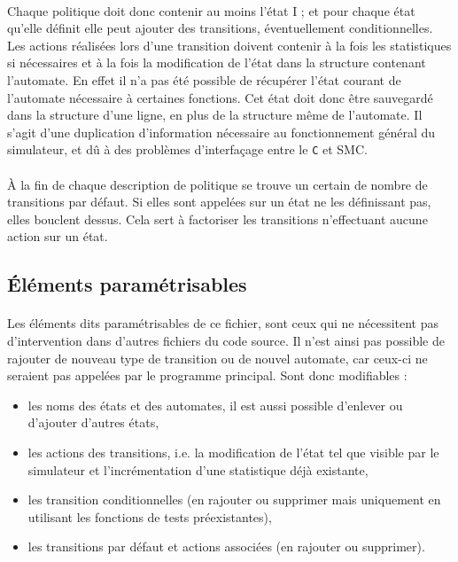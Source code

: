 \paragraph{}
Chaque politique doit donc contenir au moins l'état I ; et pour chaque état qu'elle définit elle peut ajouter des transitions, éventuellement conditionnelles. Les actions réalisées lors d'une transition doivent contenir à la fois les statistiques si nécessaires et à la fois la modification de l'état dans la structure contenant l'automate. En effet il n'a pas été possible de récupérer l'état courant de l'automate nécessaire à certaines fonctions. Cet état doit donc être sauvegardé dans la structure d'une ligne, en plus de la structure même de l'automate. Il s'agit d'une duplication d'information nécessaire au fonctionnement général du simulateur, et dû à des problèmes d'interfaçage entre le \texttt{C} et \textsf{SMC}.

\paragraph{}
\`A la fin de chaque description de politique se trouve un certain de nombre de transitions par défaut. Si elles sont appelées sur un état ne les définissant pas, elles bouclent dessus. Cela sert à factoriser les transitions n'effectuant aucune action sur un état.

\subsection{\'Eléments paramétrisables}

\paragraph{}
Les éléments dits paramétrisables de ce fichier, sont ceux qui ne nécessitent pas d'intervention dans d'autres fichiers du code source. Il n'est ainsi pas possible de rajouter de nouveau type de transition ou de nouvel automate, car ceux-ci ne seraient pas appelées par le programme principal. Sont donc modifiables : \\
\begin{itemize}
\item{les noms des états et des automates, il est aussi possible d'enlever ou d'ajouter d'autres états,}
\item{les actions des transitions, i.e. la modification de l'état tel que visible par le simulateur et l'incrémentation d'une statistique déjà existante,}
\item{les transition conditionnelles (en rajouter ou supprimer mais uniquement en utilisant les fonctions de tests préexistantes),}
\item{les transitions par défaut et actions associées (en rajouter ou supprimer).}
\end{itemize}

